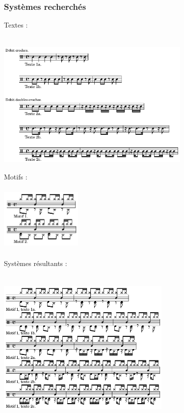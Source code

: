\subsubsection{Systèmes recherchés}
Textes :\\\\
\includegraphics[height=70mm, width=95mm]{z_images/1_description_notation/systemes/0_textes_4-4_binaires.png}\\
Motifs :\\\\
\includegraphics[height=30mm, width=40mm]{z_images/1_description_notation/systemes/1_motifs_4-4_binaires.png}\\\\
Systèmes résultants :\\\\
\includegraphics[height=75mm, width=85mm]{z_images/3_experimentations/experience_1/systeme_recherche_1.png}
